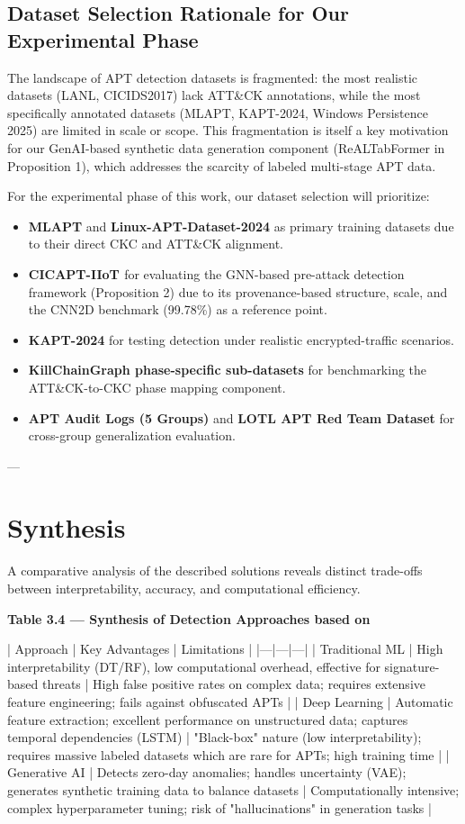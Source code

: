 \subsection{Dataset Selection Rationale for Our Experimental Phase}

The landscape of APT detection datasets is fragmented: the most realistic datasets (LANL, CICIDS2017) lack ATT\&CK annotations, while the most specifically annotated datasets (MLAPT, KAPT-2024, Windows Persistence 2025) are limited in scale or scope. This fragmentation is itself a key motivation for our GenAI-based synthetic data generation component (ReALTabFormer in Proposition 1), which addresses the scarcity of labeled multi-stage APT data.

For the experimental phase of this work, our dataset selection will prioritize:
\begin{itemize}
\item \textbf{MLAPT} and \textbf{Linux-APT-Dataset-2024} as primary training datasets due to their direct CKC and ATT\&CK alignment.
\item \textbf{CICAPT-IIoT \cite{ghiasvand2024cicapt}} for evaluating the GNN-based pre-attack detection framework (Proposition 2) due to its provenance-based structure, scale, and the CNN2D benchmark (99.78\%) as a reference point.
\item \textbf{KAPT-2024} for testing detection under realistic encrypted-traffic scenarios.
\item \textbf{KillChainGraph phase-specific sub-datasets} for benchmarking the ATT\&CK-to-CKC phase mapping component.
\item \textbf{APT Audit Logs (5 Groups)} and \textbf{LOTL APT Red Team Dataset} for cross-group generalization evaluation.
\end{itemize}

---

\section{Synthesis}

A comparative analysis of the described solutions reveals distinct trade-offs between interpretability, accuracy, and computational efficiency.

\textbf{Table 3.4 — Synthesis of Detection Approaches based on \cite{ankalaki2025cyber}}

| Approach | Key Advantages | Limitations |
|---|---|---|
| Traditional ML | High interpretability (DT/RF), low computational overhead, effective for signature-based threats | High false positive rates on complex data; requires extensive feature engineering; fails against obfuscated APTs |
| Deep Learning | Automatic feature extraction; excellent performance on unstructured data; captures temporal dependencies (LSTM) | "Black-box" nature (low interpretability); requires massive labeled datasets which are rare for APTs; high training time |
| Generative AI | Detects zero-day anomalies; handles uncertainty (VAE); generates synthetic training data to balance datasets | Computationally intensive; complex hyperparameter tuning; risk of "hallucinations" in generation tasks |

